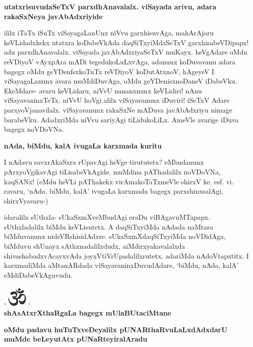 {\bigskip
\noindent
{\large\bf utatxrisuvudaSeTxV parxdhAnavalalx. viSayada arivu, adara rakaSxNeya javAbAdxriyide}}\label{page176}
\medskip

\noindent
ililx iTaTx iSuTx viSayagaLanUnx niVvu garxhisuvAga, mahArAjaru keVLidadxkekx utatxra koDabeVkAda daqSiTxyiMdaSeTxV garxhisabeVDipapx! adu parxdhAnavalalx. viSayada javAbAdxriyaSeTxV muKayx. heVgAdare oMdu reVDiyoV vAyxpAra mADi tegedukoLuLxvAga, adanunx koDuvavanu adara bagegx oMdu geYDenfsxkoTuTx reVDiyoV koDutAtxnoV, hAgeyeV I viSayagaLanunx avara muMdiDuvAga, oMdu geYDenisxnoDaneV iDabeVku. EkeMdare- avaru keVLidaru, niVvU nananxnunx keVLidiri! nAnu viSayavaninxTeTx. niVvU hoVgi alilx viSayavanunx iDuviri! iSeTxV Adare parxyoVjanavilalx. viSayavanunx rakaSxNe mADuva javAbAdxriyu nimage barabeVku. AdadxriMda niVvu sariyAgi tiLidukoLiLx. AmeVle avarige iDuva bagegx noVDoVNa.

{\bigskip
\noindent
{\large\bf nAda, biMdu, kalA ivugaLa karxmada kuritu}}\label{page177}
\medskip

\noindent
I nAdavu savxrAkaSxra rUpavAgi heVge tirututetx? eMbudanunx pArxyoVgikavAgi tiLisabeVkAgide. muMdina pAThadalilx noVDoVNa, kaqSANx! (eMdu heVLi pAThakekx virAmakoTaTxmeVle shirxV ke. esf. vi. ravaru, `nAda, biMdu, kalA' ivugaLa karxmada bagegx parxshinxsalAgi, shirxVyavaru-)


idaralilx sUthxla- sUkaSxmXveMbudAgi eraDu viBAgavuMTapapx. sUthxladalilx biMdu keVLisutetx. A daqSiTx\-yiMda nAdada naMtara biMduvanunx nideVRshisidAdxre. sUkaSxmXdaqSiTxyiMda noVDidAga, biMduvu shUnayx sAthxnadalilxdudx, aiMdirxyakavalalxda shivashabadxvAcayxvAda joyxVtiVrUpadalilxrutetx. adariMda nAdoVtapxtitx. I karxmadiMda aMtanARdada viSayavaninxDuvudAdare, `biMdu, nAda, kalA' eMdiDabeVkAguvudu.


\bigskip

\begin{center}
- \includegraphics{om.eps} -\\[8pt]
{\bf\Large{shAsAtxrXthaRgaLa bagegx mUlaBUtaciMtane}}
\end{center}


{\medskip
\noindent
{\large\bf oMdu padavu huTuTxveDeyalilx pUNARthaRvuLaLxdAdxdarU muMde beLeyutAtx pUNaRteyira\-lAradu}}\label{page177}
\medskip

